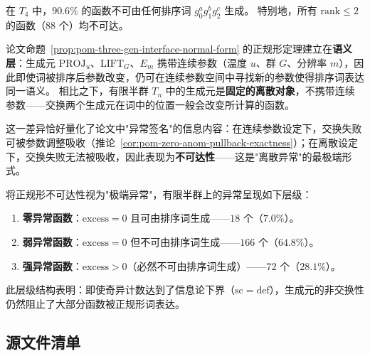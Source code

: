 \begin{proposition}[有限半群中的正规形不可达性]\label{prop:formal-nf-unreachable}
在 $T_4$ 中，$90.6\%$ 的函数不可由任何排序词 $g_0^a g_1^b g_2^c$ 生成。
特别地，所有 $\mathrm{rank}\le 2$ 的函数（$88$ 个）均不可达。
\end{proposition}

\begin{remark}\label{rem:formal-semantic-vs-syntactic}
论文命题~\ref{prop:pom-three-gen-interface-normal-form} 的正规形定理建立在\textbf{语义层}：生成元 $\mathrm{PROJ}_u$、$\mathrm{LIFT}_G$、$E_m$ 携带连续参数（温度 $u$、群 $G$、分辨率 $m$），因此即使词被排序后参数改变，仍可在连续参数空间中寻找新的参数使得排序词表达同一语义。
相比之下，有限半群 $T_n$ 中的生成元是\textbf{固定的离散对象}，不携带连续参数——交换两个生成元在词中的位置一般会改变所计算的函数。

这一差异恰好量化了论文中"异常签名"的信息内容：在连续参数设定下，交换失败可被参数调整吸收（推论~\ref{cor:pom-zero-anom-pullback-exactness}）；在离散设定下，交换失败无法被吸收，因此表现为\textbf{不可达性}——这是"离散异常"的最极端形式。
\end{remark}

\begin{corollary}[离散异常的层级结构]\label{cor:formal-discrete-anomaly-hierarchy}
将正规形不可达性视为"极端异常"，有限半群上的异常呈现如下层级：
\begin{enumerate}
  \item \textbf{零异常函数}：$\mathrm{excess}=0$ 且可由排序词生成——$18$ 个（$7.0\%$）。
  \item \textbf{弱异常函数}：$\mathrm{excess}=0$ 但不可由排序词生成——$166$ 个（$64.8\%$）。
  \item \textbf{强异常函数}：$\mathrm{excess}>0$（必然不可由排序词生成）——$72$ 个（$28.1\%$）。
\end{enumerate}
此层级结构表明：即使奇异计数达到了信息论下界（$\mathrm{sc}=\mathrm{def}$），生成元的非交换性仍然阻止了大部分函数被正规形词表达。
\end{corollary}

\subsection{源文件清单}

